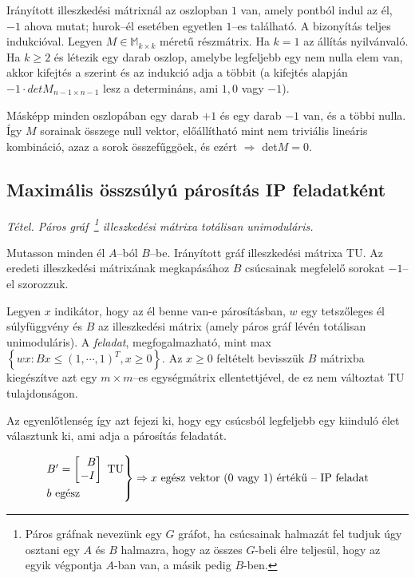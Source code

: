 Irányított illeszkedési mátrixnál az oszlopban $1$ van, amely pontból indul az
él, $-1$ ahova mutat; hurok--él esetében egyetlen $1$--es található. A
bizonyítás teljes indukcióval. Legyen $M \in \mathbb{M}_{k\times k}$ méretű
részmátrix. Ha $k=1$ az állítás nyilvánvaló. Ha $k \geq 2$ és létezik egy darab
oszlop, amelybe legfeljebb egy nem nulla elem van, akkor kifejtés a szerint és
az indukció adja a többit (a kifejtés alapján $-1\cdot detM_{n-1\times n-1}$
lesz a determináns, ami $1,0$ vagy $-1$).

Másképp minden oszlopában egy darab $+1$ és egy darab $-1$ van, és a többi
nulla. Így $M$ sorainak összege null vektor, előállítható mint nem triviális
lineáris kombináció, azaz a sorok összefűggöek, és ezért $\Rightarrow$ det$M=0$.

\subsection{Maximális összsúlyú párosítás IP feladatként}

\emph{Tétel. Páros gráf~\footnote{Páros gráfnak nevezünk egy $G$ gráfot, ha
csúcsainak halmazát fel tudjuk úgy osztani egy $A$ és $B$ halmazra, hogy az
összes $G$-beli élre teljesül, hogy az egyik végpontja $A$-ban van, a másik
pedig $B$-ben.} illeszkedési mátrixa totálisan unimoduláris.}
\vspace{0.4cm}

Mutasson minden él $A$--ból $B$--be. Irányított gráf illeszkedési mátrixa TU. Az
eredeti illeszkedési mátrixának megkapásához $B$ csúcsainak megfelelő sorokat
$-1$--el szorozzuk.

Legyen $x$ indikátor, hogy az él benne van-e párosításban, $w$ egy tetszőleges
él súlyfüggvény és $B$ az illeszkedési mátrix (amely páros gráf lévén totálisan
unimoduláris). A \emph{feladat}, megfogalmazható, mint max$\left\{ wx:Bx \leq (1,
\cdots, 1)^T, x \geq 0 \right\}$. Az $x \geq 0 $ feltételt bevisszük $B$
mátrixba kiegészítve azt egy $m \times m$--es egységmátrix ellentettjével, de ez
nem változtat TU tulajdonságon.

Az egyenlőtlenség így azt fejezi ki, hogy egy csúcsból legfeljebb egy kiinduló
élet választunk ki, ami adja a párosítás feladatát.

\[
\begin{rcases}
B'=\begin{bmatrix} ~~B \\ -I \end{bmatrix} \text{ TU} \\
b \text{ egész}
\end{rcases} \Rightarrow x \text{ egész vektor ($0$ vagy $1$) értékű -- IP feladat}
\]


